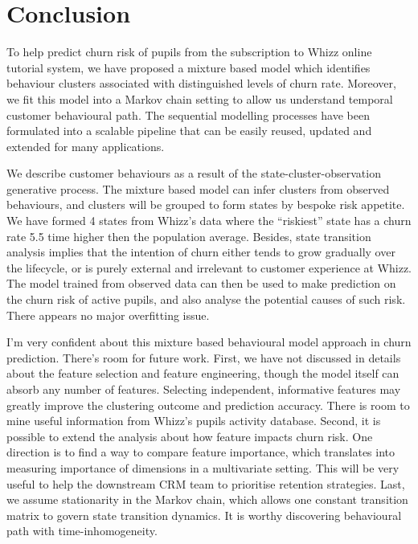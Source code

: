 \section{Conclusion}
\label{sec:conclusion}

To help predict churn risk of pupils from the subscription to Whizz online tutorial system, we have proposed a mixture based model which identifies behaviour clusters associated with distinguished levels of churn rate. Moreover, we fit this model into a Markov chain setting  to allow us understand temporal customer behavioural path. The sequential modelling processes have been formulated into a scalable pipeline that can be easily reused, updated and extended for many applications.

We describe customer behaviours as a result of the state-cluster-observation generative process. The mixture based model can infer clusters from observed behaviours, and clusters will be grouped to form states by bespoke risk appetite. We have formed 4 states from Whizz's data where the ``riskiest'' state has a churn rate 5.5 time higher then the population average. Besides, state transition analysis implies that the intention of churn either tends to grow gradually over the lifecycle, or is purely external and irrelevant to customer experience at Whizz. The model trained from observed data can then be used to make prediction on the churn risk of active pupils, and also analyse the potential causes of such risk. There appears no major overfitting issue.

I'm very confident about this mixture based behavioural model approach in churn prediction. There's room for future work. First, we have not discussed in details about the feature selection and feature engineering, though the model itself can absorb any number of features. Selecting independent, informative features may greatly improve the clustering outcome and prediction accuracy. There is room to mine useful information from Whizz's pupils activity database. Second, it is possible to extend the analysis about how feature impacts churn risk. One direction is to find a way to compare feature importance, which translates into measuring importance of dimensions in a multivariate setting. This will be very useful to help the downstream CRM team to prioritise retention strategies. Last, we assume stationarity in the Markov chain, which allows one constant transition matrix to govern state transition dynamics. It is worthy discovering behavioural path with time-inhomogeneity.